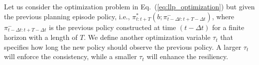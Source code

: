 \documentclass[letterpaper]{article} %
\newcommand{\phdone}[1]{} %
\newcommand{\argmax}{\mathop{\mathrm{argmax}}}
\begin{document}
\phdone{Receding Horizon Planning Re-formulation}
Let us consider the optimization problem in Eq.~(\ref{eq:llp_optimization}) but given the previous planning episode policy, i.e., 
$\pi_{t:t+T}^*(b; \pi_{t-\Delta t:t+T-\Delta t}^-)$, where $\pi_{t-\Delta t:t+T-\Delta t}^-$ is the previous policy constructed at time $(t - \Delta t)$ for a finite horizon with a length of $T$.
%
%
We define another optimization variable $\tau_t$ that specifies how long the new policy should observe the previous policy.
A larger $\tau_t$ will enforce the consistency, while a smaller $\tau_t$ will enhance the resiliency.

\end{document}

